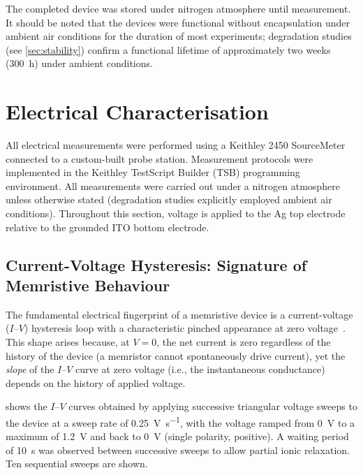 \documentclass[12pt, a4paper, twoside]{report}
\begin{document}
The completed device was stored under nitrogen atmosphere until measurement. It should be noted that the devices were functional without encapsulation under ambient air conditions for the duration of most experiments; degradation studies (see \cref{sec:stability}) confirm a functional lifetime of approximately two weeks (\SI{300}{\hour}) under ambient conditions.


\section{Electrical Characterisation}\label{sec:elec_char}

All electrical measurements were performed using a Keithley 2450 SourceMeter connected to a custom-built probe station. Measurement protocols were implemented in the Keithley TestScript Builder (TSB) programming environment. All measurements were carried out under a nitrogen atmosphere unless otherwise stated (degradation studies explicitly employed ambient air conditions). Throughout this section, voltage is applied to the Ag top electrode relative to the grounded ITO bottom electrode.

\subsection{Current-Voltage Hysteresis: Signature of Memristive Behaviour}\label{subsec:iv_hyst}

The fundamental electrical fingerprint of a memristive device is a current-voltage ($I$--$V$) hysteresis loop with a characteristic pinched appearance at zero voltage~\cite{Chua1971}. This shape arises because, at $V = 0$, the net current is zero regardless of the history of the device (a memristor cannot spontaneously drive current), yet the \textit{slope} of the $I$--$V$ curve at zero voltage (i.e., the instantaneous conductance) depends on the history of applied voltage.

 shows the $I$--$V$ curves obtained by applying successive triangular voltage sweeps to the device at a sweep rate of \SI{0.25}{\volt\per\second}, with the voltage ramped from \SI{0}{\volt} to a maximum of \SI{+1.2}{\volt} and back to \SI{0}{\volt} (single polarity, positive). A waiting period of \SI{10}{\second} was observed between successive sweeps to allow partial ionic relaxation. Ten sequential sweeps are shown.
\end{document}
